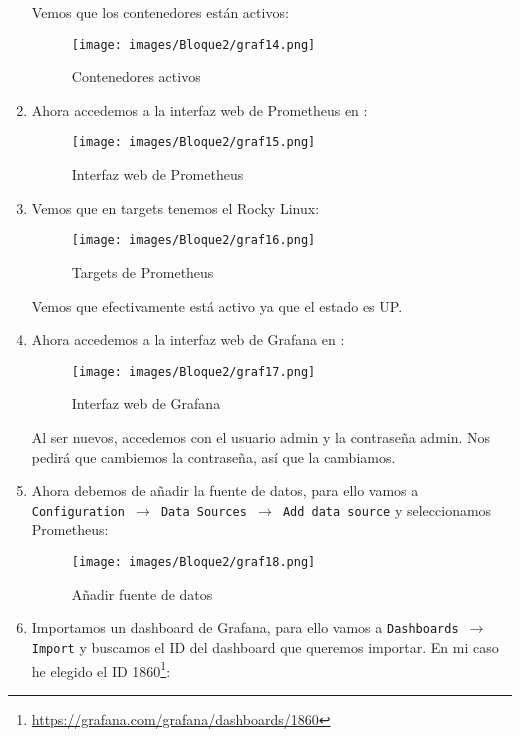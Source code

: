 \begin{enumerate}
    Vemos que los contenedores están activos:
    \begin{figure}[H]
        \centering
        \texttt{[image: images/Bloque2/graf14.png]}
        \caption{Contenedores activos}
        \label{fig:contenedores}
    \end{figure}
    \item Ahora accedemos a la interfaz web de Prometheus en :
    \begin{figure}[H]
        \centering
        \texttt{[image: images/Bloque2/graf15.png]}
        \caption{Interfaz web de Prometheus}
        \label{fig:interfaz_prometheus}
    \end{figure}
    \item Vemos que en targets tenemos el Rocky Linux:
    \begin{figure}[H]
        \centering
        \texttt{[image: images/Bloque2/graf16.png]}
        \caption{Targets de Prometheus}
        \label{fig:targets}
    \end{figure}
    Vemos que efectivamente está activo ya que el estado es UP.
    \item Ahora accedemos a la interfaz web de Grafana en :
    \begin{figure}[H]
        \centering
        \texttt{[image: images/Bloque2/graf17.png]}
        \caption{Interfaz web de Grafana}
        \label{fig:interfaz_grafana}
    \end{figure}
    Al ser nuevos, accedemos con el usuario admin y la contraseña admin. Nos pedirá que cambiemos la contraseña, así que la cambiamos.
    \item Ahora debemos de añadir la fuente de datos, para ello vamos a \texttt{Configuration $\rightarrow$ Data Sources $\rightarrow$ Add data source} y seleccionamos Prometheus:
    \begin{figure}[H]
        \centering
        \texttt{[image: images/Bloque2/graf18.png]}
        \caption{Añadir fuente de datos}
        \label{fig:fuente_datos}
    \end{figure}
    \item Importamos un dashboard de Grafana, para ello vamos a \texttt{Dashboards $\rightarrow$ Import} y buscamos el ID del dashboard que queremos importar. En mi caso he elegido el ID 1860\footnote{\url{https://grafana.com/grafana/dashboards/1860}}:
    \begin{figure}[H]

\end{figure}
\end{enumerate}
